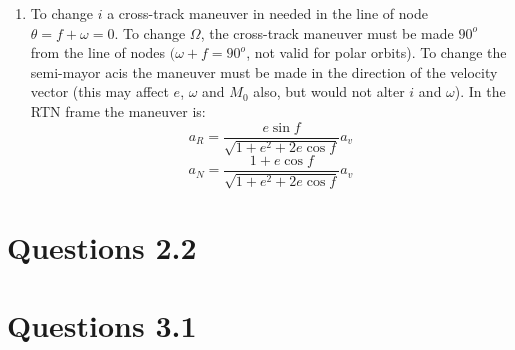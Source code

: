 \documentclass[a4paper]{article}
\begin{document}
\begin{enumerate}[label=\emph{\alph*)}]
  \item %
    To change $i$ a cross-track maneuver in needed in the line of node $\theta = f + \omega = 0$. To change $\Omega$, the cross-track maneuver must be made $90^o$ from the line of nodes $(\omega+f=90^o$, not valid for polar orbits). To change the semi-mayor acis the maneuver must be made in the direction of the velocity vector (this may affect $e$, $\omega$ and $M_0$ also, but would not alter $i$ and $\omega$). In the RTN frame the maneuver is:
    \[a_R = \frac{e\sin{f}}{\sqrt{1+e^2+2e\cos{f}}} a_v \]
    \[a_N = \frac{1+ e\cos{f}}{\sqrt{1+e^2+2e\cos{f}}} a_v \]

\end{enumerate}

\section{Questions 2.2}

\section{Questions 3.1}
\end{document}
